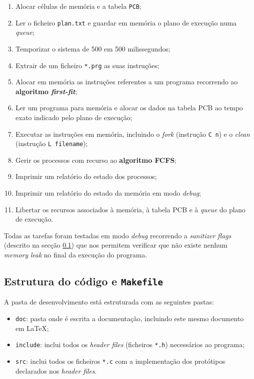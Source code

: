 \documentclass[a4paper,11pt,onecolumn,oneside]{article}
\begin{document}
	\begin{enumerate}
		\item Alocar células de memória e a tabela \texttt{\ac{PCB}};
		\item Ler o ficheiro \texttt{plan.txt} e guardar em memória o plano de execução numa \textit{queue};
		\item Temporizar o sistema de 500 em 500 milissegundos;
		\item Extrair de um ficheiro \texttt{*.prg} as suas instruções;
		\item Alocar em memória as instruções referentes a um programa recorrendo ao \textbf{algoritmo \textit{first-fit}};
		\item Ler um programa para memória e alocar os dados na tabela \ac{PCB} ao tempo exato indicado pelo plano de execução;
		\item Executar as instruções em memória, incluindo o \textit{fork} (instrução \verb|C n|) e o \textit{clean} (instrução \verb|L filename|);
		\item Gerir os processos com recurso ao \textbf{algoritmo \ac{FCFS}};
		\item Imprimir um relatório do estado dos processos;
		\item Imprimir um relatório do estado da memória em modo \textit{debug};
		\item Libertar os recursos associados à memória, à tabela \ac{PCB} e à \textit{queue} do plano de execução.
	\end{enumerate}
	
	Todas as tarefas foram testadas em modo \textit{debug} recorrendo a \textit{sanitizer flags} (descrito na secção \ref{ssec:dev:struct_makefile}) que nos permitem verificar que não existe nenhum \textit{memory leak} no final da execução do programa.
	
	
	\subsection{Estrutura do código e \texttt{Makefile}}
	\label{ssec:dev:struct_makefile}
	
	A pasta de desenvolvimento está estruturada com as seguintes pastas:
	
	\begin{itemize}
		\item \verb|doc|: pasta onde é escrita a documentação, incluindo este mesmo documento em \LaTeX;
		\item \verb|include|: inclui todos os \textit{header files} (ficheiros \verb|*.h|) necessários ao programa;
		\item \verb|src|: inclui todos os ficheiros \verb|*.c| com a implementação dos protótipos declarados nos \textit{header files}.
	\end{itemize}
	
\end{document}
